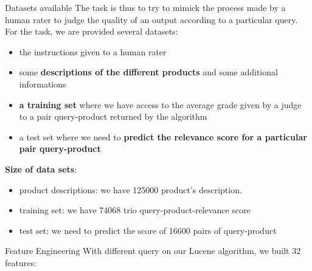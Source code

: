 \documentclass{beamer}
\newlength\postercolumnwidth
\newlength\totalwidth
\begin{document}
\begin{frame}[t]{}
\begin{columns}[totalwidth=\totalwidth]
  \begin{column}[t]{\postercolumnwidth}
    \centering
\begin{block}{Datasets available}
\small
The task is thus to try to mimick the process made by a human rater to judge the quality of an output according to a particular query. For the task, we are provided several datasets: 
\begin{itemize}
\item the instructions given to a human rater 
\item some \textbf{descriptions of the different products} and some additional informations
\item\textbf{a training set} where we have access to the average grade given by a judge to a pair query-product returned by the algorithm
\item a test set where we need to \textbf{predict the relevance score for a particular pair query-product}
\end{itemize}
\textbf{Size of data sets}:
\begin{itemize}
\item product descriptions: we have 125000 product's description. 
\item training set: we have 74068 trio query-product-relevance score
\item test set: we need to predict the score of 16600 pairs of query-product
\end{itemize}     


    \end{block}
% 
 \begin{block}{Feature Engineering}
With different query on our Lucene algorithm, we built 32 features:


\end{block}
\end{column}
\end{columns}
\end{frame}
\end{document}
